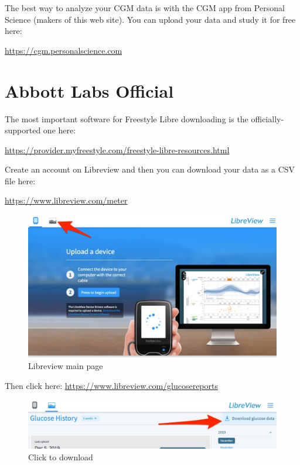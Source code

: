 \documentclass[
]{book}
\begin{document}
The best way to analyze your CGM data is with the CGM app from Personal Science (makers of this web site). You can upload your data and study it for free here:

\url{https://cgm.personalscience.com}

\hypertarget{abbott-labs-official}{%
\section{Abbott Labs Official}\label{abbott-labs-official}}

The most important software for Freestyle Libre downloading is the officially-supported one here:

\url{https://provider.myfreestyle.com/freestyle-libre-resources.html}

Create an account on Libreview and then you can download your data as a CSV file here:

\url{https://www.libreview.com/meter}

\begin{figure}
\centering
\includegraphics{images/freestyle-download.jpg}
\caption{Libreview main page}
\end{figure}

Then click here: \url{https://www.libreview.com/glucosereports}

\begin{figure}
\centering
\includegraphics{images/freestyle-download-click.jpg}
\caption{Click to download}
\end{figure}
\end{document}
